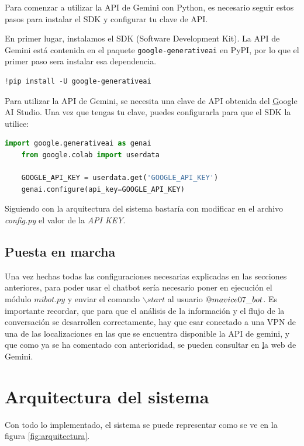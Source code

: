 Para comenzar a utilizar la API de Gemini con Python, es necesario seguir estos pasos para instalar el SDK y configurar tu clave de API.

En primer lugar, instalamos el SDK (Software Development Kit). La API de Gemini está contenida en el paquete \texttt{google-generativeai} en PyPI, por lo que el primer paso sera instalar esa dependencia.

\begin{lstlisting}[language=Python]
	!pip install -U google-generativeai
\end{lstlisting}

Para utilizar la API de Gemini, se necesita una clave de API obtenida del \href{https://aistudio.google.com/app/apikey} Google AI Studio. Una vez que tengas tu clave, puedes configurarla para que el SDK la utilice:

\begin{lstlisting}[language=Python]
	import google.generativeai as genai
	from google.colab import userdata
	
	GOOGLE_API_KEY = userdata.get('GOOGLE_API_KEY')
	genai.configure(api_key=GOOGLE_API_KEY)
\end{lstlisting}


Siguiendo con la arquitectura del sistema bastaría con modificar en el archivo \textit{config.py} el valor de la \textit{API KEY}.

\subsection{Puesta en marcha} 
Una vez hechas todas las configuraciones necesarias explicadas en las secciones anteriores, para poder usar el chatbot sería necesario poner en ejecución el módulo $mibot.py$ y enviar el comando $\backslash start$ al usuario $\makeatletter @ mavice07\_bot$. Es importante recordar, que para que el análisis de la información y el flujo de la conversación se desarrollen correctamente, hay que esar conectado a una VPN de una de las localizaciones en las que se encuentra disponible la API de gemini, y que como ya se ha comentado con anterioridad, se pueden consultar en \href{https://ai.google.dev/gemini-api/docs/available-regions?hl=es-419} la web de Gemini.
\section{Arquitectura del sistema}
Con todo lo implementado, el sistema se puede representar como se ve en la figura \ref{fig:arquitectura}. 


